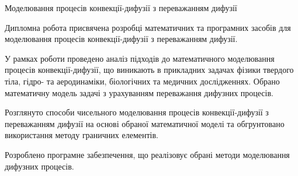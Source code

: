 \documentclass{diploma}
\begin{document}
{Моделювання процесів конвекції-дифузії з переважанням дифузії}


Дипломна робота присвячена розробці математичних та програмних засобів для моделювання процесів конвекції-дифузії з переважанням дифузії.

У рамках роботи проведено аналіз підходів до математичного моделювання процесів конвекції-дифузії, що виникають в прикладних задачах фізики твердого тіла, гідро- та аеродинаміки, біологічних та медичних дослідженнях. Обрано математичну модель задачі з урахуванням переважання дифузних процесів.

Розглянуто способи чисельного моделювання процесів конвекції-дифузії з переважанням дифузії на основі обраної математичної моделі та обгрунтовано використання методу граничних елементів.

Розроблено програмне забезпечення, що реалізовує обрані методи моделювання дифузних процесів.
\end{document}
